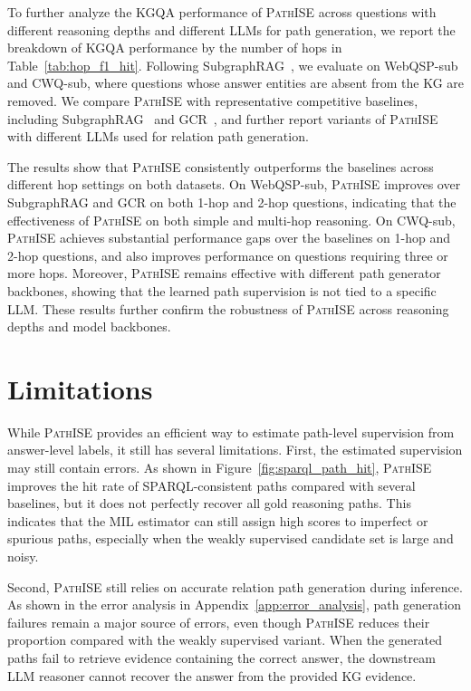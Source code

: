 \documentclass{article}
\newcommand{\framework}{\textsc{PathISE}\xspace}
\begin{document}
To further analyze the KGQA performance of \framework{} across questions with different reasoning depths and different LLMs for path generation, we report the breakdown of KGQA performance by the number of hops in Table~\ref{tab:hop_f1_hit}.
Following SubgraphRAG~\citep{li_subgraphrag_2025}, we evaluate on WebQSP-sub and CWQ-sub, where questions whose answer entities are absent from the KG are removed.
We compare \framework{} with representative competitive baselines, including SubgraphRAG~\citep{li_subgraphrag_2025} and GCR~\citep{luo_gcr_2025}, and further report variants of \framework{} with different LLMs used for relation path generation.

The results show that \framework{} consistently outperforms the baselines across different hop settings on both datasets.
On WebQSP-sub, \framework{} improves over SubgraphRAG and GCR on both 1-hop and 2-hop questions, indicating that the effectiveness of \framework on both simple and multi-hop reasoning.
On CWQ-sub, \framework{} achieves substantial performance gaps over the baselines on 1-hop and 2-hop questions, and also improves performance on questions requiring three or more hops.
Moreover, \framework{} remains effective with different path generator backbones, showing that the learned path supervision is not tied to a specific LLM.
These results further confirm the robustness of \framework{} across reasoning depths and model backbones.


\section{Limitations}\label{app:limitations}

While \framework{} provides an efficient way to estimate path-level supervision from answer-level labels, it still has several limitations.
First, the estimated supervision may still contain errors.
As shown in Figure~\ref{fig:sparql_path_hit}, \framework{} improves the hit rate of SPARQL-consistent paths compared with several baselines, but it does not perfectly recover all gold reasoning paths.
This indicates that the MIL estimator can still assign high scores to imperfect or spurious paths, especially when the weakly supervised candidate set is large and noisy.

Second, \framework{} still relies on accurate relation path generation during inference.
As shown in the error analysis in Appendix~\ref{app:error_analysis}, path generation failures remain a major source of errors, even though \framework{} reduces their proportion compared with the weakly supervised variant.
When the generated paths fail to retrieve evidence containing the correct answer, the downstream LLM reasoner cannot recover the answer from the provided KG evidence.
\end{document}
